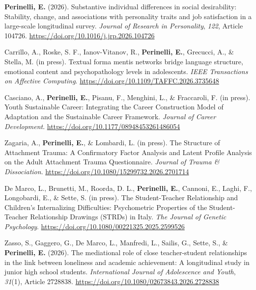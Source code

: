 \documentclass[hidelinks, letterpaper,10pt]{article} %
\begin{document}
\begin{etaremune}

\item \textbf{Perinelli, E.} (2026). Substantive individual differences in social desirability: Stability, change, and associations with personality traits and job satisfaction in a large-scale longitudinal survey. \textit{Journal of Research in Personality}, \textit{122}, Article 104726. \url{https://doi.org/10.1016/j.jrp.2026.104726}

\item Carrillo, A., Roske, S. F., Ianov-Vitanov, R., \textbf{Perinelli, E.}, Grecucci, A., \& Stella, M. (in press). Textual forma mentis networks bridge language structure, emotional content and psychopathology levels in adolescents. \textit{IEEE Transactions on Affective Computing}. \url{https://doi.org/10.1109/TAFFC.2026.3735648}

\item Casciano, A., \textbf{Perinelli, E.}, Pisanu, F., Menghini, L., \& Fraccaroli, F. (in press). Youth Sustainable Career: Integrating the Career Construction Model of Adaptation and the Sustainable Career Framework. \textit{Journal of Career Development}. \url{https://doi.org/10.1177/08948453261486054}

\item Zagaria, A., \textbf{Perinelli, E.}, \& Lombardi, L. (in press). The Structure of Attachment Trauma: A Confirmatory Factor Analysis and Latent Profile Analysis on the Adult Attachment Trauma Questionnaire. \textit{Journal of Trauma \& Dissociation}. \url{https://doi.org/10.1080/15299732.2026.2701714}

\item De Marco, L., Brunetti, M., Roorda, D. L., \textbf{Perinelli, E.}, Cannoni, E., Laghi, F., Longobardi, E., \& Sette, S. (in press). The Student-Teacher Relationship and Children’s Internalizing Difficulties: Psychometric Properties of the Student-Teacher Relationship Drawings (STRDs) in Italy. \textit{The Journal of Genetic Psychology}. \url{https://doi.org/10.1080/00221325.2025.2599526}

\item Zasso, S., Gaggero, G., De Marco, L., Manfredi, L., Sailis, G., Sette, S., \& \textbf{Perinelli, E.} (2026). The mediational role of close teacher-student relationships in the link between loneliness and academic achievement: A longitudinal study in junior high school students. \textit{International Journal of Adolescence and Youth}, \textit{31}(1), Article 2728838. \url{https://doi.org/10.1080/02673843.2026.2728838}


\end{etaremune}
\end{document}
